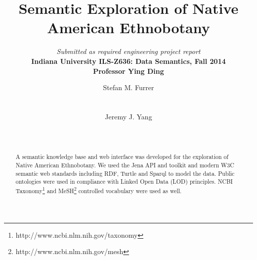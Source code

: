 \documentclass{acm_proc_article-sp}
\begin{document}
\title{Semantic Exploration of Native American Ethnobotany}

\subtitle{
	\textit{Submitted as required engineering project report}\\
	\textbf{Indiana University ILS-Z636: Data Semantics, Fall 2014}\\
	\textbf{Professor Ying Ding}\\
}



\author{
\alignauthor
Stefan M. Furrer\\
       \\
       \\
\alignauthor
Jeremy J. Yang\\
       \\
       \\
}


\maketitle
\begin{abstract}
A semantic knowledge base and web interface was developed for the exploration of Native American Ethnobotany. We used the Jena API and toolkit and modern W3C semantic web standards including RDF, Turtle and Sparql to model the data. Public ontologies were used in compliance with Linked Open Data (LOD) principles. NCBI Taxonomy\footnote{http://www.ncbi.nlm.nih.gov/taxonomy} and MeSH\footnote{http://www.ncbi.nlm.nih.gov/mesh} controlled vocabulary were used as well.  
 
\end{abstract}


\end{document}
